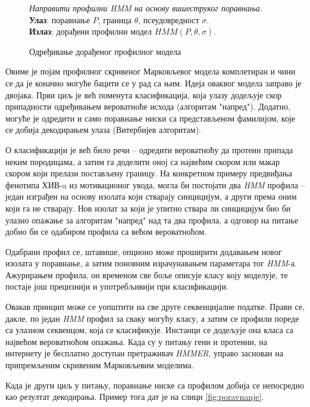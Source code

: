 \documentclass[12pt,oneside]{memoir}
\newenvironment{problem}[1][!ht]
{\renewcommand{\algorithmcfname}{Проблем}
\begin{figure}[!ht]
\centering
  \begin{minipage}{.94\linewidth}
	\begin{algorithm}[#1]%
  }{\end{algorithm}
  \end{minipage}
\end{figure}}
\begin{document}
\begin{CJK}{UTF8}{ipxm}
\begin{problem}[H]
  \SetAlgoLined
  \textit{Направити профилни \textit{HMM} на основу вишеструког поравнања.}\\
  \textbf{Улаз}: поравнање $P$, граница $\theta$, псеудовредност $\sigma$.\\
  \textbf{Излаз}: дорађени профилни модел $HMM(P, \theta, \sigma)$.
  \caption{Одређивање дорађеног профилног модела\cite{ba10f}}
  \label{prob:prof_sigma}
\end{problem}

Овиме је појам профилног скривеног Марковљевог модела комплетиран и чини се да је коначно могуће бацити се у рад са њим. Идеја оваквог модела заправо је двојака. Први циљ је већ поменута класификација, која улазу додељује скор припадности одређивањем вероватноће исхода (алгоритам "напред"). Додатно, могуће је одредити и само поравнање ниски са представљеном фамилијом, које се добија декодирањем улаза (Витербијев алгоритам).

О класификацији је већ било речи -- одредити вероватноћу да протеин припада неким породицама, а затим га доделити оној са највећим скором или макар скором који прелази постављену границу. На конкретном примеру предвиђања фенотипа ХИВ-a из мотивационог увода, могла би постојати два \textit{HMM} профила -- један изграђен на основу изолата који стварају синцицијум, а други према оним који га не стварају. Нов изолат за који је упитно ствара ли синцицијум био би улазно опажање за алгоритам "напред" над та два профила, а одговор на питање добио би се одабиром профила са већом вероватноћом.

Одабрани профил се, штавише, опционо може проширити додавањем новог изолата у поравнање, а затим поновним израчунавањем параметара тог \textit{HMM}-а. Ажурирањем профила, он временом све боље описује класу коју моделује, те постаје још прецизнији и употребљивији при класификацији.

Овакав принцип може се уопштити на све друге секвенцијалне податке. Прави се, дакле, по један \textit{HMM} профил за сваку могућу класу, а затим се профили пореде са улазном секвенцом, која се класификује. Инстанци се додељује она класа са највећом вероватноћом опажања. Када су у питању гени и протеини, на интернету је бесплатно доступан претраживач \textit{HMMER}\cite{hmmer}, управо заснован на припремљеним скривеним Марковљевим моделима.

Када је други циљ у питању, поравнање ниске са профилом добија се непосредно као резултат декодирања. Пример тога дат је на слици \ref{fig:poravnanje}.


\end{CJK}
\end{document}
